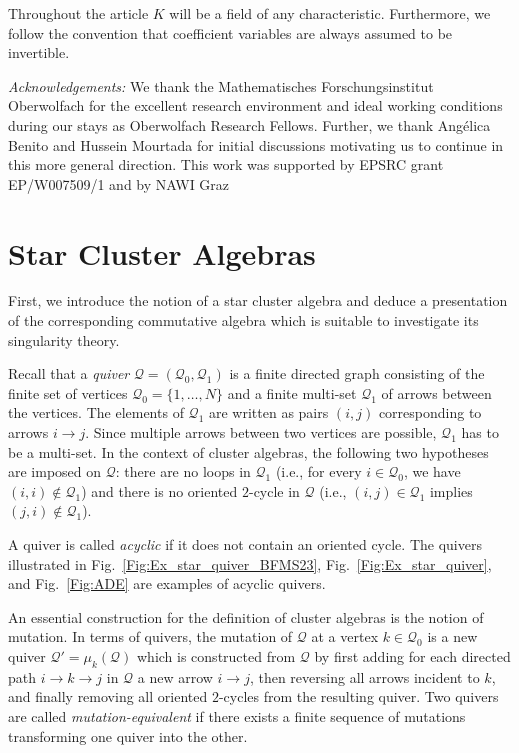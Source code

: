 \documentclass[letter,11pt]{amsart}
\newcommand{\KK}{\ensuremath{K}} %
\newcommand{\cQ}{\mathcal{Q}}
\theoremstyle{theorem}
\theoremstyle{definition}
\numberwithin{equation}{section}
\begin{document}
Throughout the article
$ \KK $ will be a field of any characteristic.
Furthermore, we follow the convention that coefficient variables are always assumed to be invertible. 



{\em Acknowledgements:}
We thank the Mathematisches Forschungs\-institut Oberwolfach for the excellent research environment and ideal working conditions during our stays as Oberwolfach Research Fellows.  
Further, we thank Ang\'elica Benito and Hussein Mourtada for initial discussions motivating us to continue in this more general direction. 
This work was supported by EPSRC grant EP/W007509/1 and by NAWI Graz








\section{Star Cluster Algebras}
\label{Sec:Star}

First, we introduce the notion of a star cluster algebra and deduce a presentation of the corresponding commutative algebra which is suitable to investigate its singularity theory. 

Recall that a {\em quiver} $ \cQ = (\cQ_0, \cQ_1) $ is a finite directed graph consisting of the finite set of vertices $ \cQ_0 = \{ 1, \ldots, N \} $ and a finite multi-set $ \cQ_1 $ of arrows between the vertices.
The elements of $ \cQ_1 $ are written as pairs $ (i,j) $ corresponding to arrows $ i \to j $.
Since multiple arrows between two vertices are possible, $ \cQ_1 $ has to be a multi-set. 
In the context of cluster algebras, the following two hypotheses are imposed on $ \cQ $: 
there are no loops in $ \cQ_1 $ (i.e., for every $ i \in \cQ_0 $, we have $ (i,i) \notin \cQ_1 $)
and there is no oriented $ 2 $-cycle in $ \cQ $ (i.e., $ (i,j) \in \cQ_1 $ implies $ (j,i) \notin \cQ_1 $).

A quiver is called {\em acyclic} if it does not contain an oriented cycle.
The quivers illustrated in Fig.~\ref{Fig:Ex_star_quiver_BFMS23}, Fig.~\ref{Fig:Ex_star_quiver}, and Fig.~\ref{Fig:ADE} are examples of acyclic quivers. 

An essential construction for the definition of cluster algebras is the notion of mutation. 
In terms of quivers,
the mutation of $ \cQ $ at a vertex $ k \in \cQ_0 $ is a new quiver $ \cQ' = \mu_k (\cQ) $
which is constructed from $ \cQ $ by
first adding for each directed path $ i \to k \to j $ in $ \cQ $ a new arrow $ i \to j $,
then reversing all arrows incident to $ k $,
and finally removing all oriented $ 2 $-cycles from the resulting quiver.
Two quivers are called {\em mutation-equivalent} if there exists a finite sequence of mutations transforming one quiver into the other. 
\end{document}
